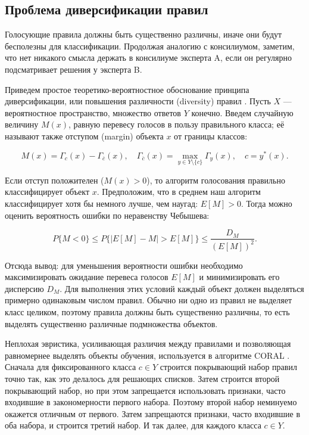 \subsection{Проблема диверсификации правил}
Голосующие правила должны быть существенно различны, иначе они будут бесполезны для классификации. Продолжая аналогию с консилиумом, заметим, что нет никакого смысла держать в консилиуме эксперта A, если он регулярно подсматривает решения у эксперта B.

Приведем простое теоретико-вероятностное обоснование принципа диверсификации, или повышения различности (diversity) правил \cite{14}. Пусть $X$ — вероятностное пространство, множество ответов $Y$ конечно. Введем случайную величину $M(x)$, равную перевесу голосов в пользу правильного класса; её называют также отступом (margin) объекта $x$ от границы классов:

\[
M(x) = \Gamma_c(x) - \Gamma_{\overline{c}}(x), \quad \Gamma_{\overline{c}}(x) = \max_{y \in Y \setminus \{c\}} \Gamma_y(x), \quad c = y^*(x).
\]

Если отступ положителен ($M(x) > 0$), то алгоритм голосования правильно классифицирует объект $x$. Предположим, что в среднем наш алгоритм классифицирует хотя бы немного лучше, чем наугад: $E[M] > 0$. Тогда можно оценить вероятность ошибки по неравенству Чебышева:

\[
P\{M < 0\} \leq P\{|E[M] - M| > E[M]\} \leq \frac{D_M}{(E[M])^2}.
\]

Отсюда вывод: для уменьшения вероятности ошибки необходимо максимизировать ожидание перевеса голосов $E[M]$ и минимизировать его дисперсию $D_M$. Для выполнения этих условий каждый объект должен выделяться примерно одинаковым числом правил. Обычно ни одно из правил не выделяет класс целиком, поэтому правила должны быть существенно различны, то есть выделять существенно различные подмножества объектов.

Неплохая эвристика, усиливающая различия между правилами и позволяющая равномернее выделять объекты обучения, используется в алгоритме CORAL \cite{12}. Сначала для фиксированного класса $c \in Y$ строится покрывающий набор правил точно так, как это делалось для решающих списков. Затем строится второй покрывающий набор, но при этом запрещается использовать признаки, часто входившие в закономерности первого набора. Поэтому второй набор неминуемо окажется отличным от первого. Затем запрещаются признаки, часто входившие в оба набора, и строится третий набор. И так далее, для каждого класса $c \in Y$.

